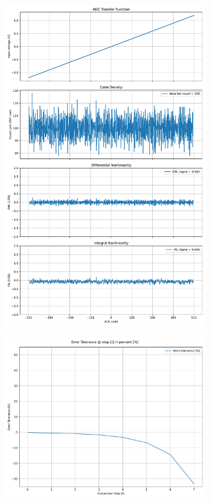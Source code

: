 \documentclass[varwidth]{standalone}
\begin{document}
\begin{figure}
\begin{subfigure}{0.32\textwidth}
    \includegraphics[width=\textwidth]{behavioral_10b_devnoise_nonlinearity.pdf}
\end{subfigure}
\begin{subfigure}{0.32\textwidth}
    \includegraphics[width=\textwidth]{behavioral_10b_devnoise_redundancy.pdf}

\end{subfigure}
\end{figure}
\end{document}
